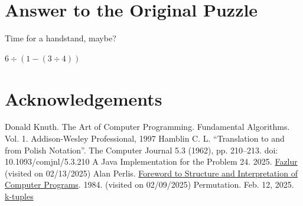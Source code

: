 \documentclass{resonance}
\begin{document}
\section{Answer to the Original Puzzle}

Time for a handstand, maybe?

\begin{rotanswer}
$6\div(1-(3\div 4))$
\end{rotanswer}


\section*{Acknowledgements}


\begin{thebibliography}{99} 
Donald Knuth. The Art of Computer Programming. Fundamental Algorithms. Vol. 1.  Addison-Wesley Professional, 1997
Hamblin C. L. “Translation to and from Polish Notation”. The Computer Journal 5.3 (1962), pp. 210–213. doi: 10.1093/comjnl/5.3.210
A Java Implementation for the Problem 24. 2025. \href{https://github.com/kedarmhaswade/impatiently-j8/blob/main/src/main/java/practice/Fazlur.java}{Fazlur} (visited on 02/13/2025)
Alan Perlis. \href{https://sourceacademy.org/sicpjs/foreword84}{Foreword to Structure and Interpretation of Computer Programs}. 1984. (visited on 02/09/2025)
Permutation. Feb. 12, 2025. \href{https://en.wikipedia.org/wiki/Permutation#Permutations_with_repetition}{k-tuples}
\end{thebibliography}
\end{document}
